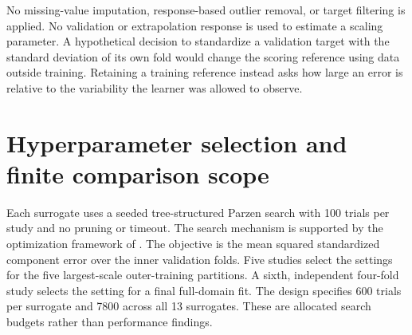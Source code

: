 No missing-value imputation, response-based outlier removal, or target filtering is applied. No validation or extrapolation response is used to estimate a scaling parameter. A hypothetical decision to standardize a validation target with the standard deviation of its own fold would change the scoring reference using data outside training. Retaining a training reference instead asks how large an error is relative to the variability the learner was allowed to observe.

\section{Hyperparameter selection and finite comparison scope}

Each surrogate uses a seeded tree-structured Parzen search with 100 trials per study and no pruning or timeout. The search mechanism is supported by the optimization framework of \citet{Akiba2019}. The objective is the mean squared standardized component error over the inner validation folds. Five studies select the settings for the five largest-scale outer-training partitions. A sixth, independent four-fold study selects the setting for a final full-domain fit. The design specifies 600 trials per surrogate and 7800 across all 13 surrogates. These are allocated search budgets rather than performance findings.

